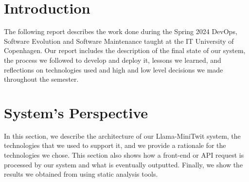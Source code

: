 \documentclass{article}
\begin{document}
\newpage
\tableofcontents
\newpage

\section{Introduction}
The following report describes the work done during the Spring 2024 DevOps, Software Evolution and Software Maintenance taught at the IT University of Copenhagen. Our report includes the description of the final state of our system, the process we followed to develop and deploy it, lessons we learned, and reflections on technologies used and high and low level decisions we made throughout the semester.

\section{System's Perspective}
In this section, we describe the architecture of our Llama-MiniTwit system, the technologies that we used to support it, and we provide a rationale for the technologies we chose. This section also shows how a front-end or API request is processed by our system and what is eventually outputted. Finally, we show the results we obtained from using static analysis tools.
\end{document}
